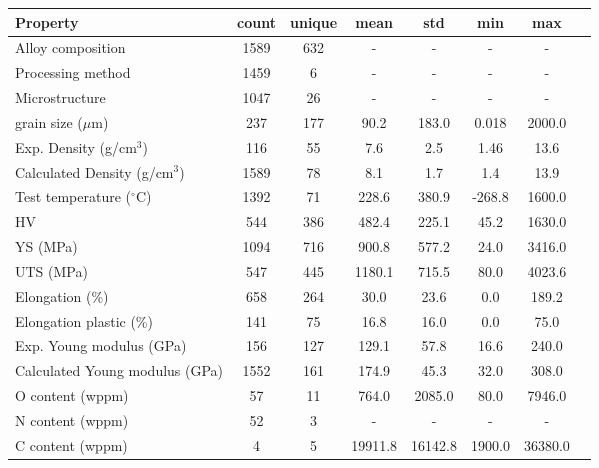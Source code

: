 \begin{tabular}{lccccccc}
\toprule
Property & count & unique & mean & std & min & max \\
\midrule
Alloy composition & 1589 & 632 & - & - & - & - \\
Processing method & 1459 & 6 & - & - & - & - \\
Microstructure & 1047 & 26 & - & - & - & - \\
grain size ($\mu$m) & 237 & 177 & 90.2 & 183.0 & 0.018 & 2000.0 \\
Exp. Density (g/cm$^3$) & 116 & 55 & 7.6 & 2.5 & 1.46 & 13.6 \\
Calculated Density (g/cm$^3$) & 1589 & 78 & 8.1 & 1.7 & 1.4 & 13.9 \\
Test temperature ($^\circ$C) & 1392 & 71 & 228.6 & 380.9 & -268.8 & 1600.0 \\
HV & 544 & 386 & 482.4 & 225.1 & 45.2 & 1630.0 \\
YS (MPa) & 1094 & 716 & 900.8 & 577.2 & 24.0 & 3416.0 \\
UTS (MPa) & 547 & 445 & 1180.1 & 715.5 & 80.0 & 4023.6 \\
Elongation (\%) & 658 & 264 & 30.0 & 23.6 & 0.0 & 189.2 \\
Elongation plastic (\%) & 141 & 75 & 16.8 & 16.0 & 0.0 & 75.0 \\
Exp. Young modulus (GPa) & 156 & 127 & 129.1 & 57.8 & 16.6 & 240.0 \\
Calculated Young modulus (GPa) & 1552 & 161 & 174.9 & 45.3 & 32.0 & 308.0 \\
O content (wppm) & 57 & 11 & 764.0 & 2085.0 & 80.0 & 7946.0 \\
N content (wppm) & 52 & 3 & - & - & - & - \\
C content (wppm) & 4 & 5 & 19911.8 & 16142.8 & 1900.0 & 36380.0 \\
\bottomrule
\end{tabular}
